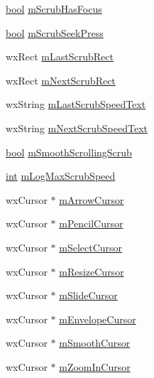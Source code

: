 \begin{DoxyCompactItemize}
\hyperlink{mac_2config_2i386_2lib-src_2libsoxr_2soxr-config_8h_abb452686968e48b67397da5f97445f5b}{bool} \hyperlink{class_track_panel_ae30f39b53fd3947ccb99b048a6efd4e3}{m\+Scrub\+Has\+Focus}
\item 
\hyperlink{mac_2config_2i386_2lib-src_2libsoxr_2soxr-config_8h_abb452686968e48b67397da5f97445f5b}{bool} \hyperlink{class_track_panel_a8082a55b36f3365b1dceefdc77da0067}{m\+Scrub\+Seek\+Press}
\item 
wx\+Rect \hyperlink{class_track_panel_a2cd5595843ff183a9d1bdcd7e911ccb4}{m\+Last\+Scrub\+Rect}
\item 
wx\+Rect \hyperlink{class_track_panel_afb81dd5b46c408b3eb546ee7d600fed0}{m\+Next\+Scrub\+Rect}
\item 
wx\+String \hyperlink{class_track_panel_aef295ebe27bee4656a73854346945495}{m\+Last\+Scrub\+Speed\+Text}
\item 
wx\+String \hyperlink{class_track_panel_aeb97bf6164e834af5dc57a013b35900e}{m\+Next\+Scrub\+Speed\+Text}
\item 
\hyperlink{mac_2config_2i386_2lib-src_2libsoxr_2soxr-config_8h_abb452686968e48b67397da5f97445f5b}{bool} \hyperlink{class_track_panel_ae17e115fd911a87f495222351dbdb22e}{m\+Smooth\+Scrolling\+Scrub}
\item 
\hyperlink{xmltok_8h_a5a0d4a5641ce434f1d23533f2b2e6653}{int} \hyperlink{class_track_panel_a8588a9e934cd4cf2933b446c8eae5679}{m\+Log\+Max\+Scrub\+Speed}
\item 
wx\+Cursor $\ast$ \hyperlink{class_track_panel_aeb8e3a8ba37bb6113d378e37dd90d910}{m\+Arrow\+Cursor}
\item 
wx\+Cursor $\ast$ \hyperlink{class_track_panel_aa6e6a57e571eec0f9842558b04945b1c}{m\+Pencil\+Cursor}
\item 
wx\+Cursor $\ast$ \hyperlink{class_track_panel_a791215c5f5f6a0263f23e10eb971205c}{m\+Select\+Cursor}
\item 
wx\+Cursor $\ast$ \hyperlink{class_track_panel_a2a074a10dd9eddf34ddfb55956b7fca7}{m\+Resize\+Cursor}
\item 
wx\+Cursor $\ast$ \hyperlink{class_track_panel_aeb18d7c6402c4b5c7c626fab5bcec748}{m\+Slide\+Cursor}
\item 
wx\+Cursor $\ast$ \hyperlink{class_track_panel_ae120daf4a0e3c0249ab1a98094edff28}{m\+Envelope\+Cursor}
\item 
wx\+Cursor $\ast$ \hyperlink{class_track_panel_a30fd1afbc5cb7aeed61bffb0e5d472e2}{m\+Smooth\+Cursor}
\item 
wx\+Cursor $\ast$ \hyperlink{class_track_panel_a48bdb309d319ab126fc86691a86ca9bc}{m\+Zoom\+In\+Cursor}

\end{DoxyCompactItemize}
